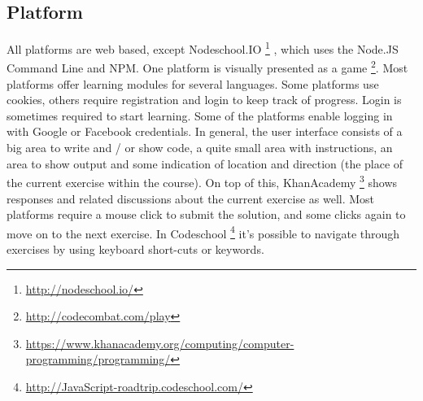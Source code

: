 \documentclass{article}
\begin{document}
\subsection{Platform}
All platforms are web based, except Nodeschool.IO
\footnote{\url{http://nodeschool.io/}}
, which uses the Node.JS 
Command Line and NPM. One platform is visually presented as a game
\footnote{\url{http://codecombat.com/play}}. Most platforms offer learning
modules for several languages. Some platforms use cookies, 
others require registration and login to keep track of progress. Login is 
sometimes required to start learning. Some of the platforms enable logging in 
with Google or Facebook credentials. \newline
In general, the user interface consists of a big area to write and / or show 
code, a quite small area with instructions, an area to show output and some 
indication of location and direction (the place of the current exercise within 
the course). On top of this, KhanAcademy
\footnote{
\url{https://www.khanacademy.org/computing/computer-programming/programming/}} 
shows responses and related discussions about the current exercise as
well. Most platforms require a mouse click to submit the solution, and some
clicks again to
move on to the next exercise. In Codeschool
\footnote{\url{http://JavaScript-roadtrip.codeschool.com/}} 
it's possible to navigate through exercises by using keyboard short-cuts or 
keywords.
\end{document}

